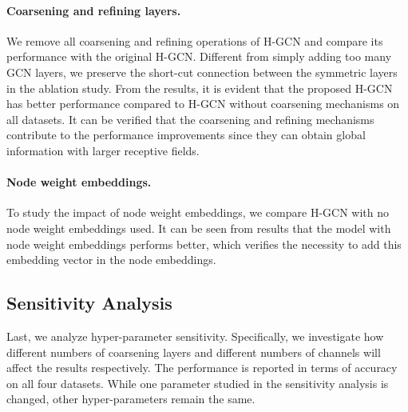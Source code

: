 \documentclass{article}
\begin{document}
\begin{table}
	\centering
	\caption{Results of the ablation study}
	\label{tab:ablation-study}
\end{table}

\paragraph{Coarsening and refining layers.}
We remove all coarsening and refining operations of H-GCN and compare its performance with the original H-GCN. Different from simply adding too many GCN layers, we preserve the short-cut connection between the symmetric layers in the ablation study. From the results, it is evident that the proposed H-GCN has better performance compared to H-GCN without coarsening mechanisms on all datasets. It can be verified that the coarsening and refining mechanisms contribute to the performance improvements since they can obtain global information with larger receptive fields.

\paragraph{Node weight embeddings.}
To study the impact of node weight embeddings, we compare H-GCN with no node weight embeddings used. It can be seen from results that the model with node weight embeddings performs better, which verifies the necessity to add this embedding vector in the node embeddings.

\subsection{Sensitivity Analysis}

Last, we analyze hyper-parameter sensitivity. Specifically, we investigate how different numbers of coarsening layers and different numbers of channels will affect the results respectively. The performance is reported in terms of accuracy on all four datasets. While one parameter studied in the sensitivity analysis is changed, other hyper-parameters remain the same.
\end{document}
